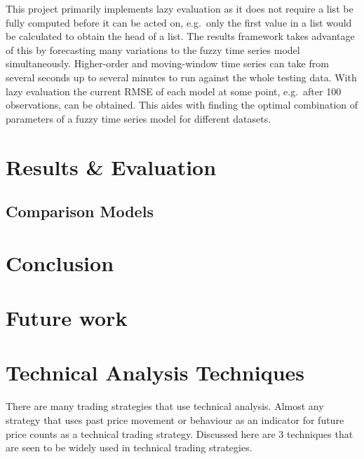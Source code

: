 \documentclass[12pt]{article}
\theoremstyle{definition}
\begin{document}
This project primarily implements lazy evaluation as it does not require a list be fully computed before it can be acted on, e.g.\ only the first value in a list would be calculated to obtain the head of a list. The results framework takes advantage of this by forecasting many variations to the fuzzy time series model simultaneously. Higher-order and moving-window time series can take from several seconds up to several minutes to run against the whole testing data. With lazy evaluation the current RMSE of each model at some point, e.g.\ after 100 observations, can be obtained. This aides with finding the optimal combination of parameters of a fuzzy time series model for different datasets.

\section{Results \& Evaluation}

\label{results}

\subsection{Comparison Models}

\section{Conclusion}

\section{Future work}

\appendix


\section{Technical Analysis Techniques}

\label{app:tatechniques}

There are many trading strategies that use technical analysis. Almost any strategy that uses past price movement or behaviour as an indicator for future price counts as a technical trading strategy. Discussed here are 3 techniques that are seen to be widely used in technical trading strategies.
\end{document}
